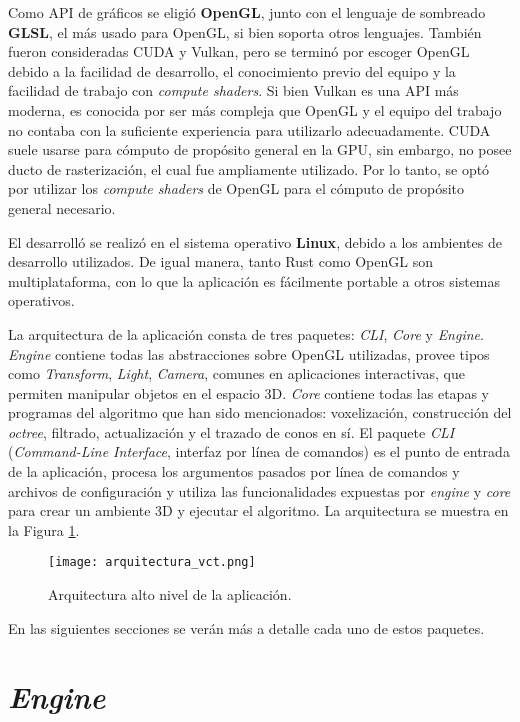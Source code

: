 Como API de gráficos se eligió \textbf{OpenGL}, junto con el lenguaje de sombreado \textbf{GLSL}, el más usado para OpenGL, si bien soporta otros lenguajes.
También fueron consideradas CUDA y Vulkan, pero se terminó por escoger OpenGL debido a la facilidad de desarrollo, el conocimiento previo del equipo y la facilidad de trabajo con \textit{compute shaders}.
Si bien Vulkan es una API más moderna, es conocida por ser más compleja que OpenGL y el equipo del trabajo no contaba con la suficiente experiencia para utilizarlo adecuadamente.
CUDA suele usarse para cómputo de propósito general en la GPU, sin embargo, no posee ducto de rasterización, el cual fue ampliamente utilizado.
Por lo tanto, se optó por utilizar los \textit{compute shaders} de OpenGL para el cómputo de propósito general necesario.

El desarrolló se realizó en el sistema operativo \textbf{Linux}, debido a los ambientes de desarrollo utilizados.
De igual manera, tanto Rust como OpenGL son multiplataforma, con lo que la aplicación es fácilmente portable a otros sistemas operativos.

La arquitectura de la aplicación consta de tres paquetes: \textit{CLI}, \textit{Core} y \textit{Engine}.
\textit{Engine} contiene todas las abstracciones sobre OpenGL utilizadas, provee tipos como \textit{Transform}, \textit{Light}, \textit{Camera}, comunes en aplicaciones interactivas, que permiten manipular objetos en el espacio 3D.
\textit{Core} contiene todas las etapas y programas del algoritmo que han sido mencionados: voxelización, construcción del \textit{octree}, filtrado, actualización y el trazado de conos en sí.
El paquete \textit{CLI} (\textit{Command-Line Interface}, interfaz por línea de comandos) es el punto de entrada de la aplicación, procesa los argumentos pasados por línea de comandos y archivos de configuración y utiliza las funcionalidades expuestas por \textit{engine} y \textit{core} para crear un ambiente 3D y ejecutar el algoritmo.
La arquitectura se muestra en la Figura \ref{fig:overall_architecture}.

\begin{figure}
    \centering
    \texttt{[image: arquitectura\_vct.png]}
    \caption{Arquitectura alto nivel de la aplicación.}
    \label{fig:overall_architecture}
\end{figure}

En las siguientes secciones se verán más a detalle cada uno de estos paquetes.

\section{\textit{Engine}}

